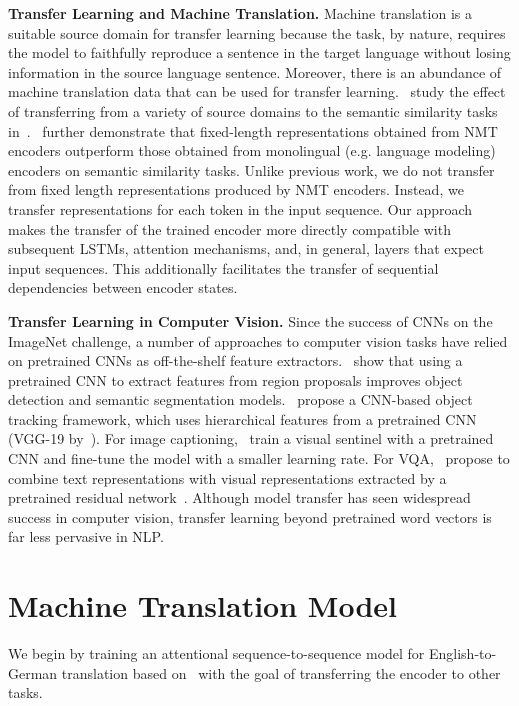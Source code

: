 \documentclass{article}
\begin{document}
\textbf{Transfer Learning and Machine Translation.}
Machine translation is a suitable source domain for transfer learning because the task,
by nature, 
requires the model to faithfully reproduce a sentence in the target language without losing information in the source language sentence.
Moreover, there is an abundance of machine translation data that can be used for transfer learning.~\citet{Hill2016LearningDR} study the effect of transferring from a variety of source domains to the semantic similarity tasks in~\citet{Agirre2014SemEval2014T1}.~\citet{Hill2017} further demonstrate that fixed-length representations obtained from NMT encoders outperform those obtained from monolingual (e.g. language modeling) encoders on semantic similarity tasks.
Unlike previous work, 
we do not transfer from fixed length representations produced by NMT encoders. 
Instead, we transfer representations for each token in the input sequence.
Our approach makes the transfer of the trained encoder more directly compatible with subsequent LSTMs, attention mechanisms, and, in general, layers that expect input sequences.
This additionally facilitates the transfer of sequential dependencies between encoder states.

\textbf{Transfer Learning in Computer Vision.} 
Since the success of CNNs on the ImageNet challenge, 
a number of approaches to computer vision tasks have relied on pretrained CNNs as off-the-shelf feature extractors.~\citet{girshick2014rich} show that using a pretrained CNN to extract features from region proposals improves object detection and semantic segmentation models.~\citet{qi2016hedged} propose a CNN-based object tracking framework, 
which uses hierarchical features from a pretrained CNN (VGG-19 by~\citet{simonyan2014very}).
For image captioning,~\citet{lu2016knowing} train a visual sentinel with a pretrained CNN and fine-tune the model with a smaller learning rate.
For VQA,~\citet{fukui2016multimodal} propose to combine text representations with visual representations extracted by a pretrained residual network~\citep{he2016deep}.
Although model transfer has seen widespread success in computer vision, 
transfer learning beyond pretrained word vectors is far less pervasive in NLP.
 \section{Machine Translation Model}

We begin by training an attentional sequence-to-sequence model for English-to-German translation based on~\citet{2017opennmt} with the goal of transferring the encoder to other tasks.
\end{document}
